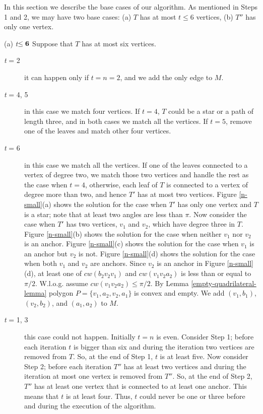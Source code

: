 \documentclass[11pt,a4paper]{article}
\newcommand{\cw}{cw}
\begin{document}
In this section we describe the base cases of our algorithm. As mentioned in Steps 1 and 2, we may have two base cases: (a) $T$ has at most $t\le 6$ vertices, (b) $T''$ has only one vertex.

\begin{paragraph}{(a) {\em t}${\bf \le 6}$} Suppose that $T$ has at most six vertices.
\begin{description}
  \item [{\em t} = 2] it can happen only if $t=n=2$, and we add the only edge to $M$.
  \item [{\em t} = 4, 5] in this case we match four vertices. If $t=4$, $T$ could be a star or a path of length three, and in both cases we match all the vertices. If $t=5$, remove one of the leaves and match other four vertices.
  \item [{\em t} = 6] in this case we match all the vertices. If one of the leaves connected to a vertex of degree two, we match those two vertices and handle the rest as the case when $t=4$, otherwise, each leaf of $T$ is connected to a vertex of degree more than two, and hence $T'$ has at most two vertices. Figure \ref{n-small}(a) shows the solution for the case when $T'$ has only one vertex and $T$ is a star; note that at least two angles are less than $\pi$. 
  Now consider the case when $T'$ has two vertices, $v_1$ and $v_2$, which have degree three in $T$. Figure \ref{n-small}(b) shows the solution for the case when neither $v_1$ nor $v_2$ is an anchor. 
  Figure \ref{n-small}(c) shows the solution for the case when $v_1$ is an anchor but $v_2$ is not.
  Figure \ref{n-small}(d) shows the solution for the case when both $v_1$ and $v_2$ are anchors. Since $v_2$ is an anchor in Figure \ref{n-small}(d), at least one of $\cw(b_2v_2v_1)$ and $\cw(v_1v_2a_2)$ is less than or equal to $\pi/2$. W.l.o.g. assume $\cw(v_1v_2a_2)\le\pi/2$. By Lemma \ref{empty-quadrilateral-lemma} polygon $P=\{v_1,a_2,v_2,a_1\}$ is convex and empty. We add $(v_1,b_1)$, $(v_2,b_2)$, and $(a_1,a_2)$ to $M$.

  \item [{\em t} = 1, 3] this case could not happen. Initially $t=n$ is even. Consider Step 1; before each iteration $t$ is bigger than six and during the iteration two vertices are removed from $T$. So, at the end of Step 1, $t$ is at least five. Now consider Step 2; before each iteration $T''$ has at least two vertices and during the iteration at most one vertex is removed from $T''$. So, at the end of Step 2, $T''$ has at least one vertex that is connected to at least one anchor. This means that $t$ is at least four. Thus, $t$ could never be one or three before and during the execution of the algorithm.


\end{description}
\end{paragraph}
\end{document}
